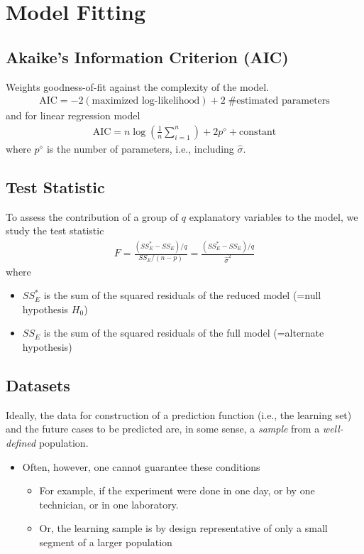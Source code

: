 \section{Model Fitting}
\subsection{Akaike's Information Criterion (AIC)}
Weights \glqq goodness-of-fit\grqq{} against the complexity of the model.
\begin{align*}
\text{AIC}
=
-2 (\text{maximized log-likelihood})
+ 2\;\text{\#estimated parameters}
\end{align*}
and for linear regression model
\begin{align*}
\text{AIC}
=
n \log\left(\frac{1}{n}\sum_{i=1}^n\right) + 2 p^\diamond + \text{constant}
\end{align*}
where $p^\diamond$ is the number of parameters,
i.e.,
including $\widehat{\sigma}$.

\subsection{Test Statistic}
To assess the contribution of a group of $q$ explanatory variables to the
model,
we study the test statistic
\begin{align*}
F
=
\frac{(SS_E^* - SS_E)/q}{SS_E/(n-p)}
=
\frac{(SS_E^* - SS_E)/q}{\widehat\sigma^2}
\end{align*}
where
\begin{itemize}
\item $SS_E^*$ is the sum of the squared residuals
of the \glqq reduced\grqq{} model (=null hypothesis $H_0$)
\item $SS_E$ is the sum of the squared residuals
of the \glqq full\grqq{} model (=alternate hypothesis)
\end{itemize}

\subsection{Datasets}
Ideally, the data for construction of a prediction function (i.e., the learning
set) and the future cases to be predicted are, in some sense, a \textit{sample}
from a \textit{well-defined} population.
\begin{itemize}
\item Often, however, one cannot guarantee these conditions
\begin{itemize}
\item For example, if the experiment were done in one day, or by one
technician, or in one laboratory.
\item Or, the learning sample is by design representative of only a small
segment of a larger population
\end{itemize}
\end{itemize}

